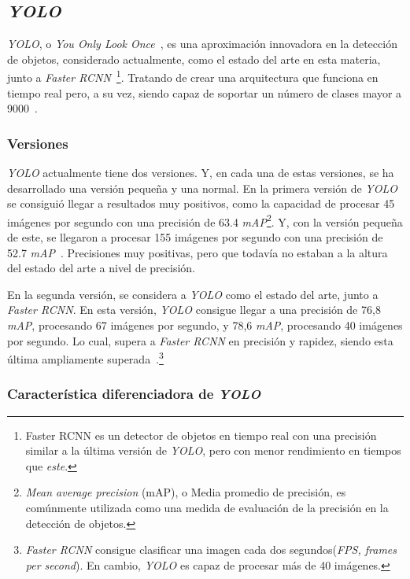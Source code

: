 \subsection{\textit{YOLO}}

\textit{YOLO}, o \textit{You Only Look Once}~\cite{yolo}, es una aproximación innovadora en la detección de objetos, considerado actualmente, como el estado del arte en esta materia, junto a \textit{Faster RCNN}~\cite{faster-rcnn}\footnote{Faster RCNN es un detector de objetos en tiempo real con una precisión similar a la última versión de \textit{YOLO}, pero con menor rendimiento en tiempos que \textit{este}.}. Tratando de crear una arquitectura que funciona en tiempo real pero, a su vez, siendo capaz de soportar un número de clases mayor a 9000~\cite{yolov2}.

\subsubsection{Versiones}

\textit{YOLO} actualmente tiene dos versiones. Y, en cada una de estas versiones, se ha desarrollado una versión pequeña y una normal. En la primera versión de \textit{YOLO} se consiguió llegar a resultados muy positivos, como la capacidad de procesar 45 imágenes por segundo con una precisión de 63.4 \textit{mAP}\footnote{\textit{Mean average precision} (mAP), o Media promedio de precisión, es comúnmente utilizada como una medida de evaluación de la precisión en la detección de objetos.}. Y, con la versión pequeña de este, se llegaron a procesar 155 imágenes por segundo con una precisión de 52.7 \textit{mAP}~\cite{yolo}. Precisiones muy positivas, pero que todavía no estaban a la altura del estado del arte a nivel de precisión.

En la segunda versión, se considera a \textit{YOLO} como el estado del arte, junto a \textit{Faster RCNN}. En esta versión, \textit{YOLO} consigue llegar a una precisión de 76,8 \textit{mAP}, procesando 67 imágenes por segundo, y 78,6 \textit{mAP}, procesando 40 imágenes por segundo. Lo cual, supera a \textit{Faster RCNN} en precisión y rapidez, siendo esta última ampliamente superada~\cite{yolov2}.\footnote{\textit{Faster RCNN} consigue clasificar una imagen cada dos segundos(\textit{FPS, frames per second}). En cambio, \textit{YOLO} es capaz de procesar más de 40 imágenes.}

\subsubsection{Característica diferenciadora de \textit{YOLO}}

